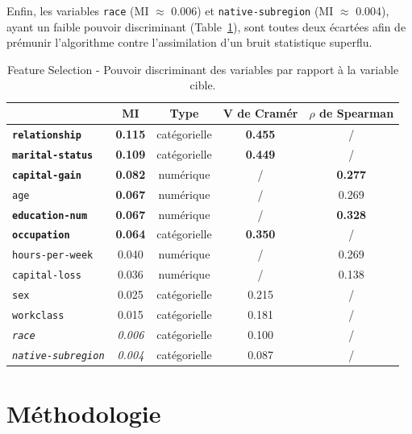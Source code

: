 \documentclass[10pt, a4paper]{article}
\begin{document}
Enfin, les variables \texttt{race} (MI $\approx$ 0.006) et \texttt{native-subregion} (MI $\approx$ 0.004), ayant un faible pouvoir discriminant (Table~\ref{tab-features}), sont toutes deux écartées afin de prémunir l'algorithme contre l'assimilation d'un bruit statistique superflu.

\begin{table}[htb]
\centering
\caption{Feature Selection - Pouvoir discriminant des variables par rapport à la variable cible.}
\label{tab-features}
\begin{tabular}{lcccc}
\toprule
 & \textbf{MI} & \textbf{Type} & \textbf{V de Cramér} & \textbf{$\rho$ de Spearman} \\
\midrule
\textbf{\texttt{relationship}}     & \textbf{0.115} & catégorielle & \textbf{0.455} & / \\
\textbf{\texttt{marital-status}}   & \textbf{0.109} & catégorielle & \textbf{0.449} & / \\
\textbf{\texttt{capital-gain}}     & \textbf{0.082} & numérique & / & \textbf{0.277} \\
\texttt{age} & \textbf{0.067}      & numérique & / & 0.269 \\
\textbf{\texttt{education-num}}    & \textbf{0.067} & numérique & / & \textbf{0.328} \\
\textbf{\texttt{occupation}}       & \textbf{0.064} & catégorielle & \textbf{0.350} & / \\
\texttt{hours-per-week}            & 0.040 & numérique & / & 0.269 \\
\texttt{capital-loss}              & 0.036 & numérique & / & 0.138 \\
\texttt{sex}                       & 0.025 & catégorielle & 0.215 & / \\
\texttt{workclass}                 & 0.015 & catégorielle & 0.181 & / \\
\textit{\texttt{race}}             & \textit{0.006} & catégorielle & 0.100 & / \\
\textit{\texttt{native-subregion}} & \textit{0.004} & catégorielle & 0.087 & / \\
\bottomrule
\end{tabular}
\end{table}

\section{Méthodologie}
\end{document}
